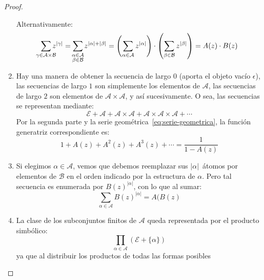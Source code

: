 \begin{proof}
\begin{enumerate}
      Alternativamente:
      \begin{align*}
	\sum_{\mathclap{\gamma \in \mathcal{A} \times \mathcal{B}}}
	     z^{\lvert \gamma \rvert}
	  = \sum_{\mathclap{\substack{
			      \alpha \in \mathcal{A} \\
			      \beta \in \mathcal{B}
		 }}} z^{\lvert \alpha \rvert + \lvert \beta \rvert}
	  = \left(
	       \sum_{\alpha \in \mathcal{A}}
		 z^{\lvert \alpha \rvert}
	     \right)
	       \cdot \left(
			\sum_{\beta \in \mathcal{B}}
			  z^{\lvert \beta \rvert}
		     \right)
	  = A(z) \cdot B(z)
      \end{align*}
    \item %
      Hay una manera de obtener la secuencia de largo 0
      (aporta el objeto vacío \(\epsilon\)),
      las secuencias de largo \(1\)
      son simplemente los elementos de \(\mathcal{A}\),
      las secuencias de largo \(2\)
      son elementos de \(\mathcal{A} \times \mathcal{A}\),
      y así sucesivamente.
      O sea,
      las secuencias se representan mediante:
      \begin{equation*}
	\mathcal{E}
	  + \mathcal{A}
	  + \mathcal{A} \times \mathcal{A}
	  + \mathcal{A} \times \mathcal{A} \times \mathcal{A}
	  + \dotsb
      \end{equation*}
      Por la segunda parte
      y la serie geométrica~\eqref{eq:serie-geometrica},
      la función generatriz correspondiente es:
      \begin{equation*}
	1 + A(z) + A^2(z) + A^3(z) + \dotsb
	  = \frac{1}{1 - A(z)}
      \end{equation*}
    \item %
      Si elegimos \(\alpha \in \mathcal{A}\),
      vemos que debemos reemplazar sus \(\lvert \alpha \rvert\)~átomos
      por elementos de \(\mathcal{B}\)
      en el orden indicado por la estructura de \(\alpha\).
      Pero tal secuencia es enumerada por \(B(z)^{\lvert \alpha \rvert}\),
      con lo que al sumar:
      \begin{equation*}
	\sum_{\alpha \in \mathcal{A}} B(z)^{\lvert \alpha \rvert}
	  = A(B(z)
      \end{equation*}
    \item %
      La clase de los subconjuntos finitos de \(\mathcal{A}\)
      queda representada por el producto simbólico:
      \begin{equation*}
	\prod_{\alpha \in \mathcal{A}} (\mathcal{E} + \{\alpha\})
      \end{equation*}
      ya que
      al distribuir los productos de todas las formas posibles

\end{enumerate}
\end{proof}
